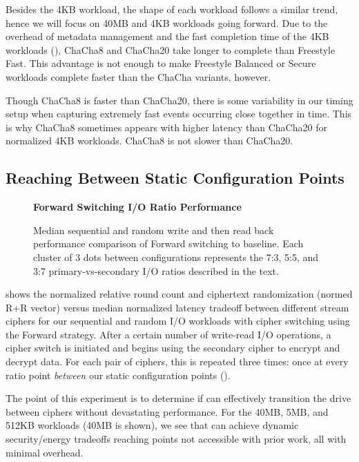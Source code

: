 Besides the 4KB workload, the shape of each workload follows a similar trend,
hence we will focus on 40MB and 4KB workloads going forward. Due to the overhead
of metadata management and the fast completion time of the 4KB workloads
(), ChaCha8 and ChaCha20 take
longer to complete than Freestyle Fast. This advantage is not enough to make
Freestyle Balanced or Secure workloads complete faster than the ChaCha variants,
however.

Though ChaCha8 is faster than ChaCha20, there is some variability in our timing
setup when capturing extremely fast events occurring close together in time.
This is why ChaCha8 sometimes appears with higher latency than ChaCha20 for
normalized 4KB workloads. ChaCha8 is not slower than ChaCha20.


\subsection{Reaching Between Static Configuration Points}\label{subsec:2}

\begin{figure}[ht]
  \textbf{Forward Switching I/O Ratio Performance}\par\medskip
  {} \caption{Median sequential and random
  write and then read back performance comparison of Forward switching to
  baseline. Each cluster of 3 dots between configurations represents the 7:3,
  5:5, and 3:7 primary-vs-secondary I/O ratios described in the text.}
  \label{fig:tradeoff-with-ratios}
\end{figure}

 shows the normalized relative round count and
ciphertext randomization (normed R+R vector) versus median normalized latency
tradeoff between different stream ciphers for our sequential and random I/O
workloads with cipher switching using the Forward strategy. After a certain
number of write-read I/O operations, a cipher switch is initiated and \sys
begins using the secondary cipher to encrypt and decrypt data. For each pair of
ciphers, this is repeated three times: once at every ratio point \emph{between}
our static configuration points ().

The point of this experiment is to determine if \sys can effectively transition
the drive between ciphers without devastating performance. For the 40MB, 5MB,
and 512KB workloads (40MB is shown), we see that \sys can achieve dynamic
security/energy tradeoffs reaching points not accessible with prior work, all
with minimal overhead.

